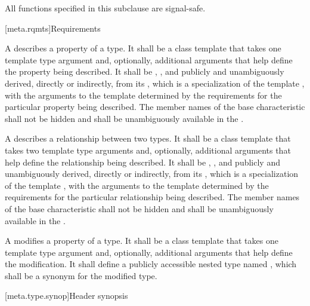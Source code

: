 \pnum
{}%
All functions specified in this subclause are signal-safe.

[meta.rqmts]{Requirements}

\pnum
A  describes a property
of a type. It shall be a class template that takes one template type
argument and, optionally, additional arguments that help define the
property being described. It shall be ,
,
and publicly and unambiguously derived, directly or indirectly, from
its , which is
a specialization of the template
, with
the arguments to the template  determined by the
requirements for the particular property being described.
The member names of the base characteristic shall not be hidden and shall be
unambiguously available in the .

\pnum
A  describes a
relationship between two types. It shall be a class template that
takes two template type arguments and, optionally, additional
arguments that help define the relationship being described. It shall
be , ,
and publicly and unambiguously derived, directly or
indirectly, from
its , which is a specialization
of the template
, with
the arguments to the template  determined by the
requirements for the particular relationship being described.
The member names of the base characteristic shall not be hidden and shall be
unambiguously available in the .

\pnum
A 
modifies a property
of a type. It shall be a class template that takes one
template type argument and, optionally, additional arguments that help
define the modification. It shall define a publicly accessible nested type
named , which shall be a synonym for the modified type.

[meta.type.synop]{Header  synopsis}

